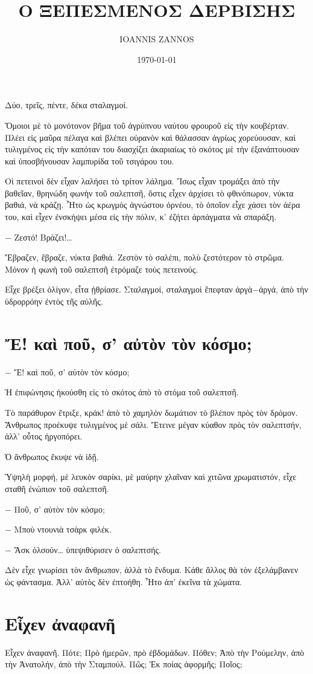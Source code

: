 \documentclass[11pt]{article}
\author{IOANNIS ZANNOS}
\date{\today}
\title{Ο ΞΕΠΕΣΜΕΝΟΣ ΔΕΡΒΙΣΗΣ}
\begin{document}
\maketitle
\tableofcontents

Δύο, τρεῖς, πέντε, δέκα σταλαγμοί.

Ὅμοιοι μὲ τὸ μονότονον βῆμα τοῦ ἀγρύπνου ναύτου φρουροῦ εἰς τὴν κουβέρταν. Πλέει εἰς μαῦρα πέλαγα καὶ βλέπει οὐρανὸν καὶ θάλασσαν ἀγρίως χορεύουσαν, καὶ τυλιγμένος εἰς τὴν καπόταν του διασχίζει ἀκαριαίως τὸ σκότος μὲ τὴν ἐξανάπτουσαν καὶ ὑποσβήνουσαν λαμπυρίδα τοῦ τσιγάρου του.

Οἱ πετεινοὶ δὲν εἶχαν λαλήσει τὸ τρίτον λάλημα. Ἴσως εἶχαν τρομάξει ἀπὸ τὴν βαθεῖαν, θρηνώδη φωνὴν τοῦ σαλεπτσῆ, ὅστις εἶχεν ἀρχίσει τὸ φθινόπωρον, νύκτα βαθιά, νὰ κράζῃ. Ἦτο ὡς κρωγμὸς ἀγνώστου ὀρνέου, τὸ ὁποῖον εἶχε χάσει τὸν ἀέρα του, καὶ εἶχεν ἐνσκήψει μέσα εἰς τὴν πόλιν, κ' ἐζήτει ἁρπάγματα νὰ σπαράξη.

− Ζεστό! Βράζει!…

Ἔβραζεν, ἔβραζε, νύκτα βαθιά. Ζεστὸν τὸ σαλέπι, πολὺ ζεστότερον τὸ στρῶμα. Μόνον ἡ φωνὴ τοῦ σαλεπτσῆ ἐτρόμαζε τοὺς πετεινούς.

Εἶχε βρέξει ὀλίγον, εἶτα ᾐθρίασε. Σταλαγμοί, σταλαγμοὶ ἔπεφταν ἀργὰ−ἀργά, ἀπὸ τὴν ὑδρορρόην ἐντὸς τῆς αὐλῆς.

\section{Ἔ! καὶ ποῦ, σ' αὐτὸν τὸν κόσμο;}
\label{sec:org5564328}
− Ἔ! καὶ ποῦ, σ' αὐτὸν τὸν κόσμο;

Ἡ ἐπιφώνησις ἠκούσθη εἰς τὸ σκότος ἀπὸ τὸ στόμα τοῦ σαλεπτσῆ.

Τὸ παράθυρον ἔτριξε, κράκ! ἀπὸ τὸ χαμηλὸν δωμάτιον τὸ βλέπον πρὸς τὸν δρόμον. Ἄνθρωπος προέκυψε τυλιγμένος μὲ σάλι. Ἔτεινε μέγαν κύαθον πρὸς τὸν σαλεπτσήν, ἀλλ' οὗτος ἠργοπόρει.

Ὁ ἄνθρωπος ἔκυψε νὰ ἰδῇ.

Ὑψηλὴ μορφή, μὲ λευκὸν σαρίκι, μὲ μαύρην χλαῖναν καὶ χιτῶνα χρωματιστόν, εἶχε σταθῆ ἐνώπιον τοῦ σαλεπτσῆ.

− Ποῦ, σ' αὐτὸν τὸν κόσμο;

− Μποὺ ντουνιὰ τσὰρκ φιλέκ.

− Ἄσκ ὀλσούν… ὑπεψιθύρισεν ὁ σαλεπτσής.

Δὲν εἶχε γνωρίσει τὸν ἄνθρωπον, ἀλλὰ τὸ ἔνδυμα. Κάθε ἄλλος θὰ τὸν ἐξελάμβανεν ὡς φάντασμα. Ἀλλ' αὐτὸς δὲν ἐπτοήθη. Ἦτο ἀπ' ἐκεῖνα τὰ χώματα.
\section{Εἶχεν ἀναφανῆ}
\label{sec:orgd1226db}
Εἶχεν ἀναφανῆ. Πότε; Πρὸ ἡμερῶν, πρὸ ἑβδομάδων. Πόθεν; Ἀπὸ τὴν Ρούμελην, ἀπὸ τὴν Ἀνατολήν, ἀπὸ τὴν Σταμπούλ. Πῶς; Ἐκ ποίας ἀφορμῆς; Ποῖος;
\end{document}
